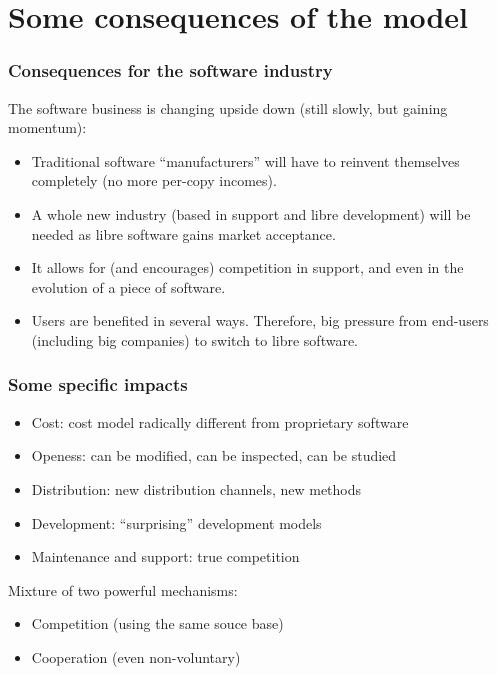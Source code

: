 
\section{Some consequences of the model}


\begin{frame}
\frametitle{Consequences for the software industry}

The software business is changing upside down (still slowly, but
gaining momentum):

\begin{itemize} 
\item Traditional software ``manufacturers'' will have to reinvent
  themselves completely (no more per-copy incomes).
\item A whole new industry (based in support and libre development)
  will be needed as libre software gains market acceptance.
\item It allows for (and encourages) competition in support, and even
  in the evolution of a piece of software.
\item Users are benefited in several ways. Therefore, big pressure
  from end-users (including big companies) to switch to libre software.
\end{itemize}

\end{frame}


\begin{frame}
\frametitle{Some specific impacts}

\begin{itemize} 
\item Cost: cost model radically different from proprietary software
\item Openess: can be modified, can be inspected, can be studied
\item Distribution: new distribution channels, new methods
\item Development: ``surprising'' development models
\item Maintenance and support: true competition
\end{itemize}

Mixture of two powerful mechanisms:

\begin{itemize}
\item Competition (using the same souce base)
\item Cooperation (even non-voluntary)
\end{itemize}

\end{frame}

